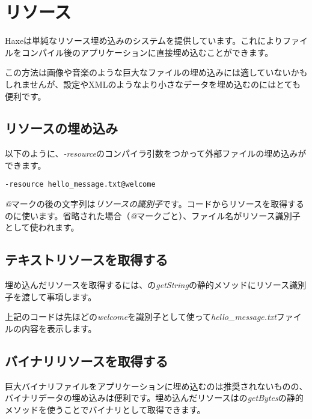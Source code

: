 \section{リソース}
\label{cr-resources}

Haxeは単純なリソース埋め込みのシステムを提供しています。これによりファイルをコンパイル後のアプリケーションに直接埋め込むことができます。

この方法は画像や音楽のような巨大なファイルの埋め込みには適していないかもしれませんが、設定やXMLのようなより小さなデータを埋め込むのにはとても便利です。

\subsection{リソースの埋め込み}
\label{cr-resources-embed}

以下のように、\emph{-resource}のコンパイラ引数をつかって外部ファイルの埋め込みができます。

\begin{lstlisting}
-resource hello_message.txt@welcome
\end{lstlisting}

\emph{@}マークの後の文字列は\emph{リソースの識別子}です。コードからリソースを取得するのに使います。省略された場合（\emph{@}マークごと）、ファイル名がリソース識別子として使われます。

\subsection{テキストリソースを取得する}
\label{cr-resources-getString}

埋め込んだリソースを取得するには、の\emph{getString}の静的メソッドにリソース識別子を渡して事項します。


上記のコードは先ほどの\emph{welcome}を識別子として使って\emph{hello_message.txt}ファイルの内容を表示します。

\subsection{バイナリリソースを取得する}
\label{cr-resources-getBytes}

巨大バイナリファイルをアプリケーションに埋め込むのは推奨されないものの、バイナリデータの埋め込みは便利です。埋め込んだリソースはの\emph{getBytes}の静的メソッドを使うことでバイナリとして取得できます。

